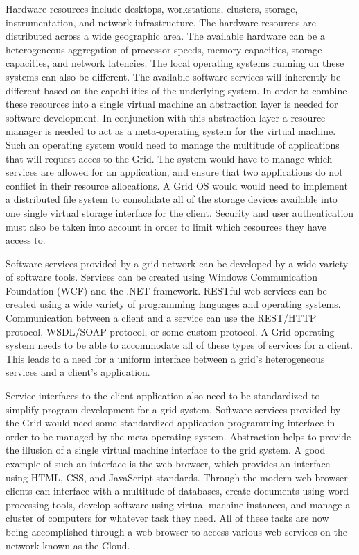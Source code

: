 \documentclass{article}
\begin{document}
Hardware resources include desktops, workstations, clusters, storage, instrumentation, and network infrastructure. The hardware resources are distributed across a wide geographic area. The available hardware can be a heterogeneous aggregation of processor speeds, memory capacities, storage capacities, and network latencies. The local operating systems running on these systems can also be different. The available software services will inherently be different based on the capabilities of the underlying system. In order to combine these resources into a single virtual machine an abstraction layer is needed for software development. In conjunction with this abstraction layer a resource manager is needed to act as a meta-operating system for the virtual machine. Such an operating system would need to manage the multitude of applications that will request acces to the Grid. The system would have to manage which services are allowed for an application, and ensure that two applications do not conflict in their resource allocations. A Grid OS would would need to implement a distributed file system to consolidate all of the storage devices available into one single virtual storage interface for the client. Security and user authentication must also be taken into account in order to limit which resources they have access to.  

Software services provided by a grid network can be developed by a wide variety of software tools. Services can be created using Windows Communication Foundation (WCF) and the .NET framework. RESTful web services can be created using a wide variety of programming languages and operating systems. Communication between a client and a service can use the REST/HTTP protocol, WSDL/SOAP protocol, or some custom protocol. A Grid operating system needs to be able to accommodate all of these types of services for a client. This leads to a need for a uniform interface between a grid's heterogeneous services and a client's application. 

Service interfaces to the client application also need to be standardized to simplify program development for a grid system. Software services provided by the Grid would need some standardized application programming interface in order to be managed by the meta-operating system. Abstraction helps to provide the illusion of a single virtual machine interface to the grid system. A good example of such an interface is the web browser, which provides an interface using HTML, CSS, and JavaScript standards. Through the modern web browser clients can interface with a multitude of databases, create documents using word processing tools, develop software using virtual machine instances, and manage a cluster of computers for whatever task they need. All of these tasks are now being accomplished through a web browser to access various web services on the network known as the Cloud. 
\end{document}
